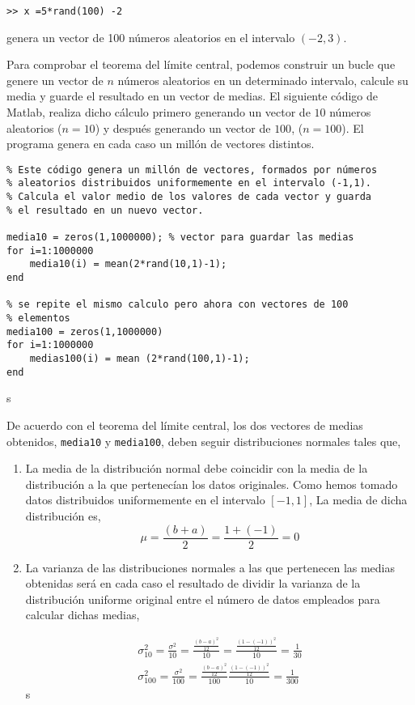\begin{verbatim}
>> x =5*rand(100) -2
\end{verbatim}
genera un vector de 100 números aleatorios en el intervalo $(-2,3)$.

Para comprobar el teorema del límite central, podemos construir un bucle que genere un vector de $n$ números aleatorios en un determinado intervalo, calcule su media y guarde el resultado en un vector de medias. El siguiente código de Matlab, realiza dicho cálculo primero generando un vector de $10$ números aleatorios ($n = 10$) y después generando un vector de $100$, ($n=100$).  El programa genera en cada caso un millón de vectores distintos.
\begin{lstlisting}
% Este código genera un millón de vectores, formados por números 
% aleatorios distribuidos uniformemente en el intervalo (-1,1).
% Calcula el valor medio de los valores de cada vector y guarda
% el resultado en un nuevo vector.

media10 = zeros(1,1000000); % vector para guardar las medias
for i=1:1000000
 	media10(i) = mean(2*rand(10,1)-1);
end

% se repite el mismo calculo pero ahora con vectores de 100
% elementos
media100 = zeros(1,1000000)
for i=1:1000000
	medias100(i) = mean (2*rand(100,1)-1);
end	
\end{lstlisting}s

De acuerdo con el teorema del límite central, los dos vectores de medias obtenidos, \texttt{media10} y \texttt{media100}, deben seguir distribuciones normales tales que,
\begin{enumerate}
\item La media de la distribución normal debe coincidir con la media de la distribución a la que pertenecían los datos originales. Como hemos tomado datos distribuidos uniformemente en el intervalo $[-1,1]$, La media de dicha distribución es,
\begin{equation*}
\mu = \frac{(b+a)}{2}=\frac{1+(-1)}{2}=0
\end{equation*}
\item La varianza de las distribuciones normales a las que pertenecen las medias obtenidas será en cada caso el resultado de dividir la varianza de la distribución uniforme original entre el número de datos empleados para calcular dichas medias,


\begin{align*}
\sigma_{10}^2 = \frac{\sigma^2}{10}=\frac{\frac{(b-a)^2}{12}}{10}=\frac{\frac{(1-(-1))^2}{12}}{10}=\frac{1}{30}\\
\sigma_{100}^2 = \frac{\sigma^2}{100}=\frac{\frac{(b-a)^2}{12}}{100}\frac{\frac{(1-(-1))^2}{12}}{10}=\frac{1}{300}
\end{align*}s
\end{enumerate}

